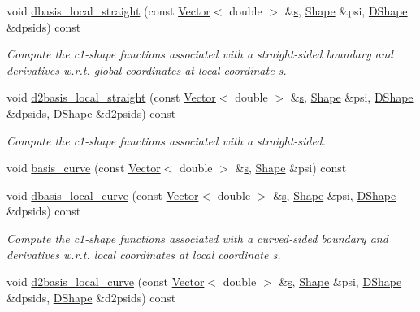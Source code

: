 \begin{DoxyCompactItemize}
\item 
void \hyperlink{classoomph_1_1C1CurvedElement_3_012_00_01NNODE__1D_01_4_af4a862475f941e4bc210e8e366d5dffc}{dbasis\+\_\+local\+\_\+straight} (const \hyperlink{classoomph_1_1Vector}{Vector}$<$ double $>$ \&\hyperlink{cfortran_8h_ab7123126e4885ef647dd9c6e3807a21c}{s}, \hyperlink{classoomph_1_1Shape}{Shape} \&psi, \hyperlink{classoomph_1_1DShape}{D\+Shape} \&dpsids) const
\begin{DoxyCompactList}\small\item\em Compute the c1-\/shape functions associated with a straight-\/sided boundary and derivatives w.\+r.\+t. global coordinates at local coordinate s. \end{DoxyCompactList}\item 
void \hyperlink{classoomph_1_1C1CurvedElement_3_012_00_01NNODE__1D_01_4_a4fc4db790fca7513a3e8ceb0a7a61507}{d2basis\+\_\+local\+\_\+straight} (const \hyperlink{classoomph_1_1Vector}{Vector}$<$ double $>$ \&\hyperlink{cfortran_8h_ab7123126e4885ef647dd9c6e3807a21c}{s}, \hyperlink{classoomph_1_1Shape}{Shape} \&psi, \hyperlink{classoomph_1_1DShape}{D\+Shape} \&dpsids, \hyperlink{classoomph_1_1DShape}{D\+Shape} \&d2psids) const
\begin{DoxyCompactList}\small\item\em Compute the c1-\/shape functions associated with a straight-\/sided. \end{DoxyCompactList}\item 
void \hyperlink{classoomph_1_1C1CurvedElement_3_012_00_01NNODE__1D_01_4_a97e774d78da4118400b554ddf59fdbeb}{basis\+\_\+curve} (const \hyperlink{classoomph_1_1Vector}{Vector}$<$ double $>$ \&\hyperlink{cfortran_8h_ab7123126e4885ef647dd9c6e3807a21c}{s}, \hyperlink{classoomph_1_1Shape}{Shape} \&psi) const
\item 
void \hyperlink{classoomph_1_1C1CurvedElement_3_012_00_01NNODE__1D_01_4_acf9269ed50d607b0bd52efcca1848040}{dbasis\+\_\+local\+\_\+curve} (const \hyperlink{classoomph_1_1Vector}{Vector}$<$ double $>$ \&\hyperlink{cfortran_8h_ab7123126e4885ef647dd9c6e3807a21c}{s}, \hyperlink{classoomph_1_1Shape}{Shape} \&psi, \hyperlink{classoomph_1_1DShape}{D\+Shape} \&dpsids) const
\begin{DoxyCompactList}\small\item\em Compute the c1-\/shape functions associated with a curved-\/sided boundary and derivatives w.\+r.\+t. local coordinates at local coordinate s. \end{DoxyCompactList}\item 
void \hyperlink{classoomph_1_1C1CurvedElement_3_012_00_01NNODE__1D_01_4_aa0473d19ec3717e1628e85206497bb75}{d2basis\+\_\+local\+\_\+curve} (const \hyperlink{classoomph_1_1Vector}{Vector}$<$ double $>$ \&\hyperlink{cfortran_8h_ab7123126e4885ef647dd9c6e3807a21c}{s}, \hyperlink{classoomph_1_1Shape}{Shape} \&psi, \hyperlink{classoomph_1_1DShape}{D\+Shape} \&dpsids, \hyperlink{classoomph_1_1DShape}{D\+Shape} \&d2psids) const

\end{DoxyCompactItemize}
